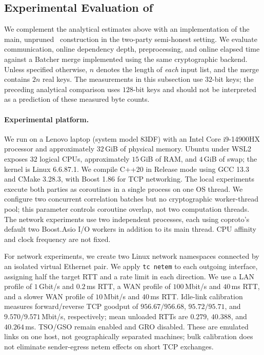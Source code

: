 

\subsection{Experimental Evaluation of \ourprotocol}\label{sec:impl-eval}

We complement the analytical estimates above with an implementation of the main,
unpruned \ourprotocol\ construction in the two-party semi-honest setting.
We evaluate communication, online dependency depth, preprocessing, and online
elapsed time against a Batcher merge implemented using the same cryptographic
backend. Unless specified otherwise, $n$ denotes the length of \emph{each} input
list, and the merge contains $2n$ real keys. The measurements in this subsection
use $32$-bit keys; the preceding analytical comparison uses $128$-bit keys and
should not be interpreted as a prediction of these measured byte counts.

\paragraph{Experimental platform.}
We run on a Lenovo laptop (system model 83DF) with an Intel Core i9-14900HX
processor and approximately $32$\,GiB of physical memory. Ubuntu under WSL2
exposes $32$ logical CPUs, approximately $15$\,GiB of RAM, and $4$\,GiB of swap;
the kernel is Linux 6.6.87.1. We compile C++20 in Release mode using GCC 13.3
and CMake 3.28.3, with Boost 1.86 for TCP networking.
The local experiments execute both parties as coroutines in a single process
on one OS thread. We configure two concurrent correlation batches but no
cryptographic worker-thread pool; this parameter controls coroutine overlap,
not two computation threads. The network experiments use two independent
processes, each using coproto's default two Boost.Asio I/O workers in addition
to its main thread. CPU affinity and clock frequency are not fixed.

For network experiments, we create two Linux network namespaces connected by
an isolated virtual Ethernet pair. We apply \texttt{tc netem} to each outgoing
interface, assigning half the target RTT and a rate limit in each direction.
We use a LAN profile of $1$\,Gbit/s and $0.2$\,ms RTT, a WAN profile of
$100$\,Mbit/s and $40$\,ms RTT, and a slower WAN profile of $10$\,Mbit/s and
$40$\,ms RTT. Idle-link calibration measures forward/reverse TCP goodput of
$956.67/956.68$, $95.72/95.71$, and $9.570/9.571$\,Mbit/s, respectively;
mean unloaded RTTs are $0.279$, $40.388$, and $40.264$\,ms.
TSO/GSO remain enabled and GRO disabled. These are emulated links on one host,
not geographically separated machines; bulk calibration does not eliminate
sender-egress netem effects on short TCP exchanges.

